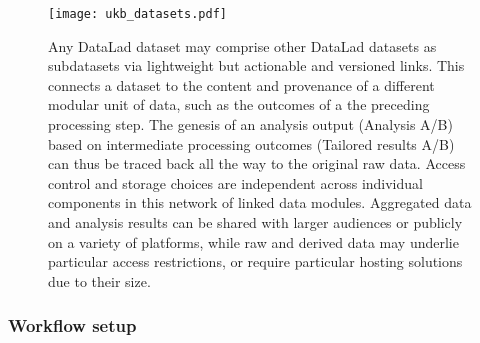 \begin{figure}
	\centering
	\texttt{[image: ukb\_datasets.pdf]}
	\caption[Overview of DataLad dataset linkage through processing and reuse]{Any DataLad dataset may comprise other DataLad datasets as subdatasets via lightweight but actionable and versioned links. This connects a dataset to the content and provenance of a different modular unit of data, such as the outcomes of a the preceding processing step. The genesis of an analysis output (Analysis A/B) based on intermediate processing outcomes (Tailored results A/B) can thus be traced back all the way to the original raw data. Access control and storage choices are independent across individual components in this network of linked data modules. Aggregated data and analysis results can be shared with larger audiences or publicly on a variety of platforms, while raw and derived data may underlie particular access restrictions, or require particular hosting solutions due to their size.}
	\label{fig:fairly_datasets}
\end{figure}

\subsubsection{Workflow setup}

